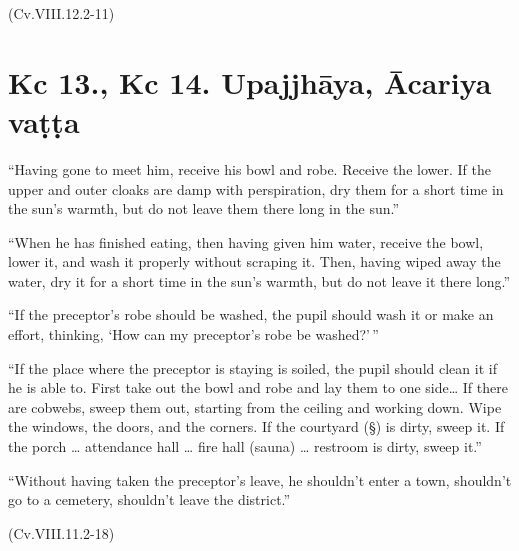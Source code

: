 (Cv.VIII.12.2-11)

\section{Kc 13., Kc 14. Upajjhāya, Ācariya vaṭṭa}

``Having gone to meet him, receive his bowl and robe. Receive the lower.
If the upper and outer cloaks are damp with perspiration, dry them for a
short time in the sun's warmth, but do not leave them there long in the
sun.''

``When he has finished eating, then having given him water, receive the
bowl, lower it, and wash it properly without scraping it. Then, having
wiped away the water, dry it for a short time in the sun's warmth, but
do not leave it there long.''

``If the preceptor's robe should be washed, the pupil should wash it or
make an effort, thinking, `How can my preceptor's robe be washed?'\,''

``If the place where the preceptor is staying is soiled, the pupil
should clean it if he is able to. First take out the bowl and robe and
lay them to one side\ldots{} If there are cobwebs, sweep them out,
starting from the ceiling and working down. Wipe the windows, the doors,
and the corners. If the courtyard (§) is dirty, sweep it. If the porch
\ldots{} attendance hall \ldots{} fire hall (sauna) \ldots{} restroom is
dirty, sweep it.''

``Without having taken the preceptor's leave, he shouldn't enter a town,
shouldn't go to a cemetery, shouldn't leave the district.''

(Cv.VIII.11.2-18)

